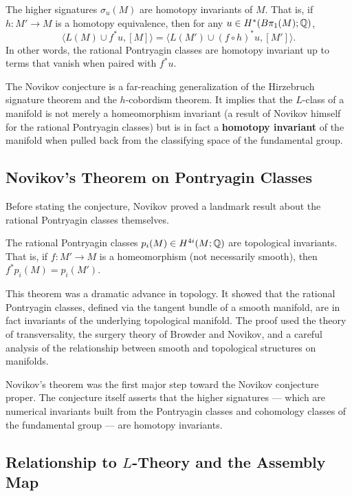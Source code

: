 \begin{conjecture}
The higher signatures \(\sigma_u(M)\) are homotopy invariants of \(M\). That is, if \(h: M' \to M\) is a homotopy equivalence, then for any \(u \in H^*(B\pi_1(M); \mathbb{Q})\),
\[
\langle L(M) \cup f^* u, [M] \rangle = \langle L(M') \cup (f \circ h)^* u, [M'] \rangle.
\]
In other words, the rational Pontryagin classes are homotopy invariant up to terms that vanish when paired with \(f^* u\).
\end{conjecture}

The Novikov conjecture is a far-reaching generalization of the Hirzebruch signature theorem and the \(h\)-cobordism theorem. It implies that the \(L\)-class of a manifold is not merely a homeomorphism invariant (a result of Novikov himself for the rational Pontryagin classes) but is in fact a \textbf{homotopy invariant} of the manifold when pulled back from the classifying space of the fundamental group.

\subsection{Novikov's Theorem on Pontryagin Classes}

Before stating the conjecture, Novikov proved a landmark result about the rational Pontryagin classes themselves.

\begin{theorem}[Novikov, 1965]
The rational Pontryagin classes \(p_i(M) \in H^{4i}(M; \mathbb{Q})\) are topological invariants. That is, if \(f: M' \to M\) is a homeomorphism (not necessarily smooth), then \(f^* p_i(M) = p_i(M')\).
\end{theorem}

This theorem was a dramatic advance in topology. It showed that the rational Pontryagin classes, defined via the tangent bundle of a smooth manifold, are in fact invariants of the underlying topological manifold. The proof used the theory of transversality, the surgery theory of Browder and Novikov, and a careful analysis of the relationship between smooth and topological structures on manifolds.

Novikov's theorem was the first major step toward the Novikov conjecture proper. The conjecture itself asserts that the higher signatures --- which are numerical invariants built from the Pontryagin classes and cohomology classes of the fundamental group --- are homotopy invariants.

\subsection{Relationship to \texorpdfstring{\(L\)}{L}-Theory and the Assembly Map}


